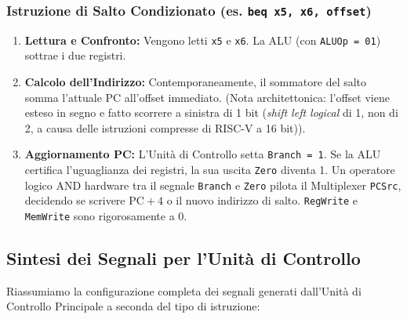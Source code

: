 \documentclass[12pt, a4paper]{article}
\begin{document}
\subsubsection{Istruzione di Salto Condizionato (es. \texttt{beq x5, x6, offset})}
\begin{enumerate}
    \item \textbf{Lettura e Confronto:} Vengono letti \texttt{x5} e \texttt{x6}. La ALU (con \texttt{ALUOp = 01}) sottrae i due registri.
    \item \textbf{Calcolo dell'Indirizzo:} Contemporaneamente, il sommatore del salto somma l'attuale PC all'offset immediato. (Nota architettonica: l'offset viene esteso in segno e fatto scorrere a sinistra di 1 bit (\textit{shift left logical} di 1, non di 2, a causa delle istruzioni compresse di RISC-V a 16 bit)).
    \item \textbf{Aggiornamento PC:} L'Unità di Controllo setta \texttt{Branch = 1}. Se la ALU certifica l'uguaglianza dei registri, la sua uscita \texttt{Zero} diventa 1. Un operatore logico AND hardware tra il segnale \texttt{Branch} e \texttt{Zero} pilota il Multiplexer \texttt{PCSrc}, decidendo se scrivere $\text{PC} + 4$ o il nuovo indirizzo di salto. \texttt{RegWrite} e \texttt{MemWrite} sono rigorosamente a 0.
\end{enumerate}

\subsection{Sintesi dei Segnali per l'Unità di Controllo}
Riassumiamo la configurazione completa dei segnali generati dall'Unità di Controllo Principale a seconda del tipo di istruzione:

\begin{table}[H]
    \centering
    \caption{Tabella della Verità per i segnali dell'Unità di Controllo Principale.}
\end{table}
\end{document}
